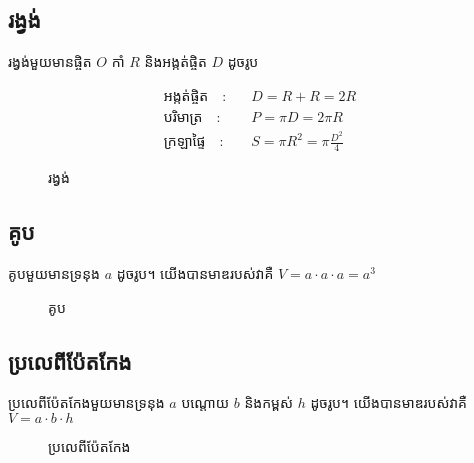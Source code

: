 \subsection{រង្វង់}
រង្វង់មួយមានផ្ចិត $O$ កាំ $R$ និងអង្កត់ផ្ចិត $D$ ដូចរូប
\begin{multicols}{2}
	\begin{align*}
	\text{អង្កត់ផ្ចិត}\quad :&\quad D=R+R=2R\\
	\text{បរិមាត្រ}\quad :&\quad P=\pi D=2\pi R\\
	\text{ក្រឡាផ្ទៃ}\quad :&\quad S=\pi R^{2}=\pi\frac{D^{2}}{4}
	\end{align*}
	\begin{figure}[H]
		\centering
		\caption{រង្វង់}
	\end{figure}
\end{multicols}
\subsection{គូប}
គូបមួយមានទ្រនុង $a$ ដូចរូប។ យើងបានមាឌរបស់វាគឺ $V=a\cdot a\cdot a=a^{3}$
\begin{figure}[H]
	\centering
	\caption{គូប}
\end{figure}
\subsection{ប្រលេពីប៉ែតកែង}
ប្រលេពីប៉ែតកែងមួយមានទ្រនុង $a$ បណ្តោយ $b$ និងកម្ពស់ $h$ ដូចរូប។ យើងបានមាឌរបស់វាគឺ $V=a\cdot b\cdot h$
\begin{figure}[H]
	\centering
	\caption{ប្រលេពីប៉ែតកែង}
\end{figure}
